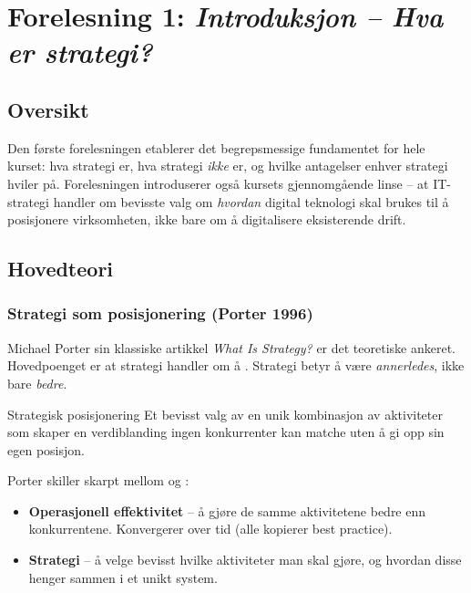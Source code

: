 \section{Forelesning 1: \emph{Introduksjon -- Hva er strategi?}}
\label{sec:lec01}

\subsection*{Oversikt}
Den første forelesningen etablerer det begrepsmessige fundamentet for hele kurset:
hva strategi er, hva strategi \emph{ikke} er, og hvilke antagelser enhver strategi
hviler på. Forelesningen introduserer også kursets gjennomgående linse -- at
IT-strategi handler om bevisste valg om \emph{hvordan} digital teknologi skal brukes
til å posisjonere virksomheten, ikke bare om å digitalisere eksisterende drift.

\subsection{Hovedteori}

\subsubsection*{Strategi som posisjonering (Porter 1996)}
Michael Porter sin klassiske artikkel \emph{What Is Strategy?} er det teoretiske
ankeret. Hovedpoenget er at strategi handler om å . Strategi
betyr å være \emph{annerledes}, ikke bare \emph{bedre}.

\begin{definition}{Strategisk posisjonering}
Et bevisst valg av en unik kombinasjon av aktiviteter som skaper en
verdiblanding ingen konkurrenter kan matche uten å gi opp sin egen posisjon.
\end{definition}

Porter skiller skarpt mellom  og :
\begin{itemize}
  \item \textbf{Operasjonell effektivitet} -- å gjøre de samme aktivitetene bedre
    enn konkurrentene. Konvergerer over tid (alle kopierer best practice).
  \item \textbf{Strategi} -- å velge bevisst hvilke aktiviteter man skal gjøre, og
    hvordan disse henger sammen i et unikt system.
\end{itemize}

